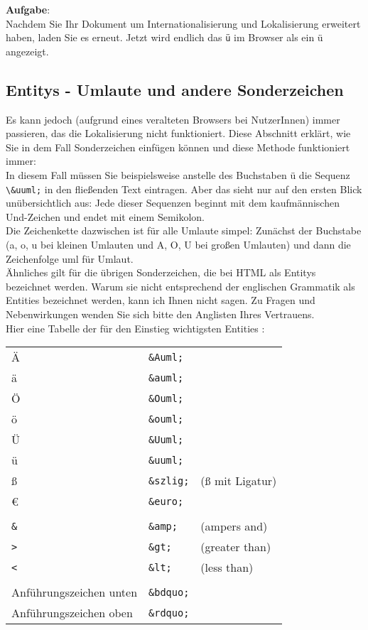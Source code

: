 \textbf{Aufgabe}:\\

Nachdem Sie Ihr Dokument um Internationalisierung und Lokalisierung erweitert haben, laden Sie es erneut. Jetzt wird endlich das \verb|ü| im Browser als ein ü angezeigt.

\subsection{Entitys - Umlaute und andere Sonderzeichen}

Es kann jedoch (aufgrund eines veralteten Browsers bei NutzerInnen) immer passieren, das die Lokalisierung nicht funktioniert. Diese Abschnitt erklärt, wie Sie in dem Fall Sonderzeichen einfügen können und diese Methode funktioniert immer:\\

In diesem Fall müssen Sie beispielsweise anstelle des Buchstaben ü die Sequenz \verb|\&uuml;| in den fließenden Text eintragen. Aber das sieht nur auf den ersten Blick unübersichtlich aus: Jede dieser Sequenzen beginnt mit dem kaufmännischen Und-Zeichen und endet mit einem Semikolon.\\

Die Zeichenkette dazwischen ist für alle Umlaute simpel: Zunächst der Buchstabe (a, o, u bei kleinen Umlauten und A, O, U bei großen Umlauten) und dann die Zeichenfolge uml für Umlaut.\\

Ähnliches gilt für die übrigen Sonderzeichen, die bei HTML als Entitys bezeichnet werden. Warum sie nicht entsprechend der englischen Grammatik als Entities bezeichnet werden, kann ich Ihnen nicht sagen. Zu Fragen und Nebenwirkungen wenden Sie sich bitte den Anglisten Ihres Vertrauens.\\

Hier eine Tabelle der für den Einstieg wichtigsten Entities :\\

\begin{tabular}{l l l}
	Ä & \verb|&Auml;|\\
	ä & \verb|&auml;|\\	
	Ö & \verb|&Ouml;|\\	
	ö & \verb|&ouml;|\\	
	Ü & \verb|&Uuml;|\\	
	ü & \verb|&uuml;|\\	
	ß & \verb|&szlig;| & (ß mit Ligatur)\\
	€ & \verb|&euro;|	\\
	\\
	\verb|&| & \verb|&amp;|	& (ampers and)\\
	\verb|>| & \verb|&gt;| & (greater than)\\
	\verb|<| & \verb|&lt;| & (less than)\\
	\\
	Anführungszeichen unten & \verb|&bdquo;|\\
	Anführungszeichen oben & \verb|&rdquo;|	\\
\end{tabular}

